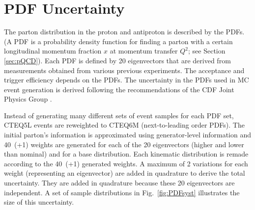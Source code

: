 \section{PDF Uncertainty}
The parton distribution in the proton and antiproton is described by the PDFs. (A PDF is a probability density function for finding a parton with a certain longitudinal momentum fraction $x$ at momentum transfer $Q^{2}$; see Section \ref{sec:pQCD}). Each PDF is defined by 20 eigenvectors that are derived from measurements obtained from various previous experiments. The acceptance and trigger efficiency depends on the PDFs. The uncertainty in the PDFs used in MC event generation is derived following the recommendations of the CDF Joint Physics Group \cite{www:JPforPDFsyst, cdfnote:7051}.

Instead of generating many different sets of \MC event samples for each PDF set, {\sc CTEQ5L} events are reweighted to {\sc CTEQ6M} (next-to-leading order PDFs). The initial parton's information is approximated using generator-level information and 40~(+1) weights are generated for each of the 20 eigenvectors (higher and lower than nominal) and for a base distribution. Each kinematic distribution is remade according to the 40~(+1) generated weights. A maximum of 2 variations for each weight (representing an eigenvector) are added in quadrature to derive the total uncertainty. They are added in quadrature because these 20 eigenvectors are independent. A set of sample distributions in Fig.~\ref{fig:PDFsyst} illustrates the size of this uncertainty.


